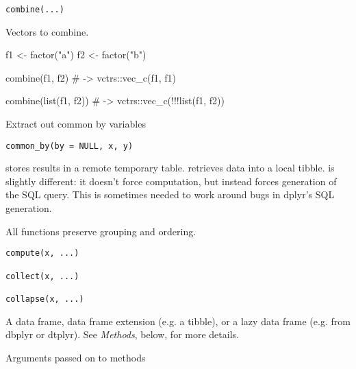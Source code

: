 \documentclass[a4paper]{book}
\begin{document}
%
\begin{Usage}
\begin{verbatim}
combine(...)
\end{verbatim}
\end{Usage}
%
\begin{Arguments}
\begin{ldescription}
\item[\code{...}] Vectors to combine.
\end{ldescription}
\end{Arguments}
%
\begin{Examples}
\begin{ExampleCode}
f1 <- factor("a")
f2 <- factor("b")

combine(f1, f2)
# ->
vctrs::vec_c(f1, f1)

combine(list(f1, f2))
# ->
vctrs::vec_c(!!!list(f1, f2))
\end{ExampleCode}
\end{Examples}
%
\begin{Description}
Extract out common by variables
\end{Description}
%
\begin{Usage}
\begin{verbatim}
common_by(by = NULL, x, y)
\end{verbatim}
\end{Usage}
%
\begin{Description}
 stores results in a remote temporary table.
 retrieves data into a local tibble.
 is slightly different: it doesn't force computation, but
instead forces generation of the SQL query. This is sometimes needed to work
around bugs in dplyr's SQL generation.

All functions preserve grouping and ordering.
\end{Description}
%
\begin{Usage}
\begin{verbatim}
compute(x, ...)

collect(x, ...)

collapse(x, ...)
\end{verbatim}
\end{Usage}
%
\begin{Arguments}
\begin{ldescription}
\item[\code{x}] A data frame, data frame extension (e.g. a tibble), or a lazy
data frame (e.g. from dbplyr or dtplyr). See \emph{Methods}, below, for more
details.

\item[\code{...}] Arguments passed on to methods
\end{ldescription}
\end{Arguments}
\end{document}

